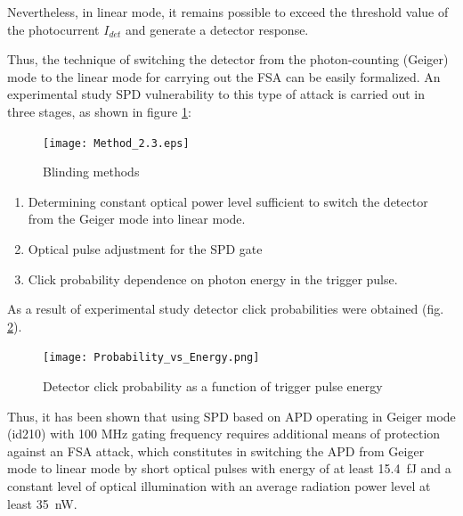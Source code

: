 Nevertheless, in linear mode, it remains possible to exceed the threshold value of the photocurrent $I_{det}$ and generate a detector response.

Thus, the technique of switching the detector from the photon-counting (Geiger) mode to the linear mode for carrying out the FSA can be easily formalized. An experimental study SPD vulnerability to this type of attack is carried out in three stages, as shown in figure \ref{fig:Method_2.3}:
%
 \begin{figure}[ht] 
  \centering
  \texttt{[image: Method\_2.3.eps]}
  \caption{Blinding methods}
  \label{fig:Method_2.3}
\end{figure}
%
 \begin{enumerate}
	\item Determining constant optical power level sufficient to switch the detector from the Geiger mode into linear mode.
	\item Optical pulse adjustment for the SPD gate
	\item Click probability dependence on photon energy in the trigger pulse.
\end{enumerate}
%
As a result of experimental study detector click probabilities were obtained (fig. \ref{fig:Probability_vs_Energy}). 

\begin{figure}[ht]
  \centering
  \texttt{[image: Probability\_vs\_Energy.png]}
  \caption{Detector click probability as a function of trigger pulse energy}
  \label{fig:Probability_vs_Energy}
\end{figure}


Thus, it has been shown that using SPD based on APD operating in Geiger mode (id210) with 100 MHz gating frequency requires additional means of protection against an FSA attack, which constitutes in switching the APD from Geiger mode to linear mode by short optical pulses with energy of at least 15.4~fJ and a constant level of optical illumination with an average radiation power level at least 35~nW. 

